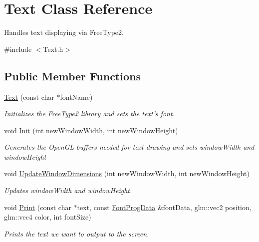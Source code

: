 \hypertarget{class_text}{\section{Text Class Reference}
\label{class_text}
}


Handles text displaying via Free\-Type2.  




{\ttfamily \#include $<$Text.\-h$>$}

\subsection*{Public Member Functions}
\begin{DoxyCompactItemize}
\item 
\hypertarget{class_text_ac1cafde3cebee3d3674cc00a7053d587}{\hyperlink{class_text_ac1cafde3cebee3d3674cc00a7053d587}{Text} (const char $\ast$font\-Name)}\label{class_text_ac1cafde3cebee3d3674cc00a7053d587}

\begin{DoxyCompactList}\small\item\em Initializes the Free\-Type2 library and sets the text's font. \end{DoxyCompactList}\item 
\hypertarget{class_text_ada8b5f53791bef8333901b22cd0ec703}{void \hyperlink{class_text_ada8b5f53791bef8333901b22cd0ec703}{Init} (int new\-Window\-Width, int new\-Window\-Height)}\label{class_text_ada8b5f53791bef8333901b22cd0ec703}

\begin{DoxyCompactList}\small\item\em Generates the Open\-G\-L buffers needed for text drawing and sets {\ttfamily window\-Width} and {\ttfamily window\-Height} \end{DoxyCompactList}\item 
\hypertarget{class_text_ae1baa534a834f3144fc2e494611ef31c}{void \hyperlink{class_text_ae1baa534a834f3144fc2e494611ef31c}{Update\-Window\-Dimensions} (int new\-Window\-Width, int new\-Window\-Height)}\label{class_text_ae1baa534a834f3144fc2e494611ef31c}

\begin{DoxyCompactList}\small\item\em Updates window\-Width and window\-Height. \end{DoxyCompactList}\item 
void \hyperlink{class_text_a8938dea4351e06fd1620f4725531aaa5}{Print} (const char $\ast$text, const \hyperlink{struct_font_prog_data}{Font\-Prog\-Data} \&font\-Data, glm\-::vec2 position, glm\-::vec4 color, int font\-Size)
\begin{DoxyCompactList}\small\item\em Prints the {\ttfamily text} we want to output to the screen. \end{DoxyCompactList}\end{DoxyCompactItemize}
